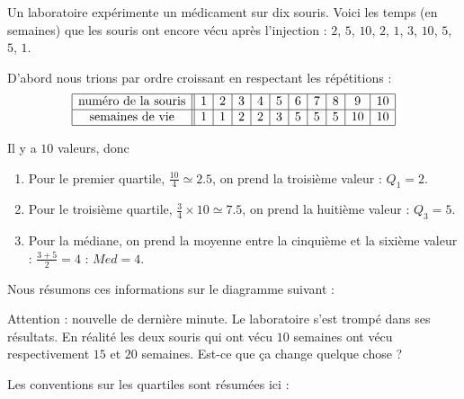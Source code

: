\begin{example}

    Un laboratoire expérimente un médicament sur dix souris. Voici les temps (en semaines) que les souris ont encore vécu après l'injection : \( 2\), \( 5\), \( 10\), \( 2\), \( 1\), \( 3\), \( 10\), \( 5\), \( 5\), \( 1\).

    D'abord nous trions par ordre croissant en respectant les répétitions :
    \begin{equation*}
        \begin{array}[]{|c||c|c|c|c|c|c|c|c|c|c|}
            \hline
            \text{numéro de la souris}&1&2&3&4&5&6&7&8&9&10\\
            \hline
            \text{semaines de vie}&1&1&2&2&3&5&5&5&10&10\\
            \hline
        \end{array}
    \end{equation*}

    Il y a \( 10\) valeurs, donc 
    \begin{enumerate}
        \item
            Pour le premier quartile, \( \frac{ 10 }{ 4 }\simeq 2.5\), on prend la troisième valeur : \( Q_1=2\).
        \item
            Pour le troisième quartile, \( \frac{ 3}{ 4 }\times 10\simeq 7.5\), on prend la huitième valeur : \( Q_3=5\).
        \item
            Pour la médiane, on prend la moyenne entre la cinquième et la sixième valeur : \( \frac{ 3+5 }{2}=4\) : \( Med=4\).
    \end{enumerate}

    Nous résumons ces informations sur le diagramme suivant :


    \begin{center}
        
    \end{center}


    Attention : nouvelle de dernière minute. Le laboratoire s'est trompé dans ses résultats. En réalité les deux souris qui ont vécu \( 10\) semaines ont vécu respectivement \( 15\) et \( 20\) semaines. Est-ce que ça change quelque chose ?

\end{example}

Les conventions sur les quartiles sont résumées ici :

\begin{center}
   
\end{center}

